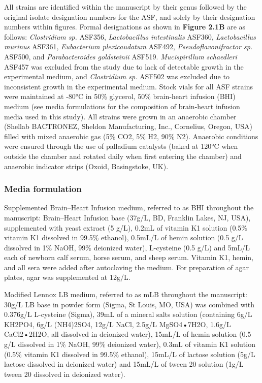 \documentclass[11pt,twocolumn,notitlepage,openany,twoside]{book}
\begin{document}
\begin{refsection}
All strains are identified within the manuscript by their genus followed by the original isolate designation numbers for the ASF, and solely by their designation numbers within figures. Formal designations as shown in \textbf{Figure 2.1B} are as follows: \textit{Clostridium sp.} ASF356, \textit{Lactobacillus intestinalis} ASF360, \textit{Lactobacillus murinus} ASF361, \textit{Eubacterium plexicaudatum} ASF492, \textit{Pseudoflavonifractor sp.} ASF500, and \textit{Parabacteroides goldsteinii} ASF519. \textit{Mucispirillum schaedleri} ASF457 was excluded from the study due to lack of detectable growth in the experimental medium, and \textit{Clostridium sp.} ASF502 was excluded due to inconsistent growth in the experimental medium. Stock vials for all ASF strains were maintained at -80°C in 50\% glycerol, 50\% brain-heart infusion (BHI) medium (see media formulations for the composition of brain-heart infusion media used in this study). All strains were grown in an anaerobic chamber (Shellab BACTRONEZ, Sheldon Manufacturing, Inc., Cornelius, Oregon, USA) filled with mixed anaerobic gas (5\% CO2, 5\% H2, 90\% N2). Anaerobic conditions were ensured through the use of palladium catalysts (baked at 120°C when outside the chamber and rotated daily when first entering the chamber) and anaerobic indicator strips (Oxoid, Basingstoke, UK).

\subsubsection{Media formulation}

Supplemented Brain–Heart Infusion medium, referred to as BHI throughout the manuscript: Brain–Heart Infusion base (37g/L, BD, Franklin Lakes, NJ, USA), supplemented with yeast extract (5 g/L), 0.2mL of vitamin K1 solution (0.5\% vitamin K1 dissolved in 99.5\% ethanol), 0.5mL/L of hemin solution (0.5 g/L dissolved in 1\% NaOH, 99\% deionized water), L-cysteine (0.5 g/L) and 5mL/L each of newborn calf serum, horse serum, and sheep serum. Vitamin K1, hemin, and all sera were added after autoclaving the medium. For preparation of agar plates, agar was supplemented at 12g/L.

Modified Lennox LB medium, referred to as mLB throughout the manuscript:  30g/L LB base in powder form (Sigma, St Louis, MO, USA) was combined with 0.376g/L L-cysteine (Sigma), 39mL of a mineral salts solution (containing 6g/L KH2PO4, 6g/L (NH4)2SO4, 12g/L NaCl, 2.5g/L MgSO4•7H2O, 1.6g/L CaCl2•2H2O, all dissolved in deionized water), 15mL/L of hemin solution (0.5 g/L dissolved in 1\% NaOH, 99\% deionized water), 0.3mL of vitamin K1 solution (0.5\% vitamin K1 dissolved in 99.5\% ethanol), 15mL/L of lactose solution (5g/L lactose dissolved in deionized water) and 15mL/L of tween 20 solution (1g/L tween 20 dissolved in deionized water).


\end{refsection}
\end{document}
